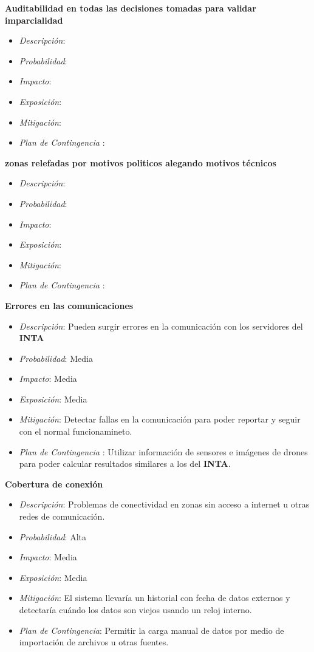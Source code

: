 \textbf{Auditabilidad en todas las decisiones tomadas para validar imparcialidad}
\begin{itemize}
 \item \textsl{Descripci\'on}: 
 \item \textsl{Probabilidad}: 
 \item \textsl{Impacto}: 
 \item \textsl{Exposición}: 
 \item \textsl{Mitigación}: 
 \item \textsl{Plan de Contingencia} : 
\end{itemize}
\textbf{zonas relefadas por motivos politicos alegando motivos t\'ecnicos}
\begin{itemize}
 \item \textsl{Descripci\'on}: 
 \item \textsl{Probabilidad}: 
 \item \textsl{Impacto}: 
 \item \textsl{Exposición}: 
 \item \textsl{Mitigación}: 
 \item \textsl{Plan de Contingencia} : 
\end{itemize}

\textbf{Errores en las comunicaciones}
\begin{itemize}
 \item \textsl{Descripci\'on}: Pueden surgir errores en la comunicación con los servidores del \textbf{INTA}
 \item \textsl{Probabilidad}: Media
 \item \textsl{Impacto}: Media
 \item \textsl{Exposición}: Media
 \item \textsl{Mitigación}: Detectar fallas en la comunicación para poder reportar y seguir con el normal funcionamineto.
 \item \textsl{Plan de Contingencia} : Utilizar informaci\'on de sensores e imágenes de drones para poder calcular resultados similares a los del \textbf{INTA}.
\end{itemize}

\textbf{Cobertura de conexión}
\begin{itemize}
 \item \textsl{Descripci\'on}: Problemas de conectividad en zonas sin acceso a internet u otras redes de comunicación.
 \item \textsl{Probabilidad}: Alta
 \item \textsl{Impacto}: Media
 \item \textsl{Exposición}: Media
 \item \textsl{Mitigación}: El sistema llevaría un historial con fecha de datos externos y detectaría cuándo los datos son viejos usando un reloj interno.
 \item \textsl{Plan de Contingencia}: Permitir la carga manual de datos por medio de importación de archivos u otras fuentes.
\end{itemize}

